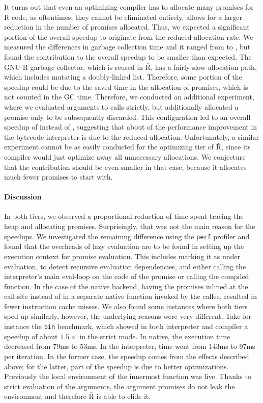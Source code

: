 \documentclass[screen,acmsmall]{acmart}
\renewcommand{\Rsh}{{\sf\v R}\xspace}
\begin{document}
It turns out that even an optimizing compiler has to allocate many promises for
R code, as oftentimes, they cannot be eliminated entirely. \rshstrict allows for
a larger reduction in the number of promises allocated. Thus, we expected a
significant portion of the overall speedup to originate from the reduced
allocation rate. We measured the differences in garbage collection time and it
ranged from \speedupGCRshStrictMin to \speedupGCRshStrictMax, but found the
contribution to the overall speedup to be smaller than expected. The GNU R
garbage collector, which is reused in \Rsh, has a fairly slow allocation path,
which includes mutating a doubly-linked list. Therefore, some portion of the
speedup could be due to the saved time in the allocation of promises, which is
not counted in the GC time. Therefore, we conducted an additional experiment,
where we evaluated arguments to calls strictly, but additionally allocated a
promise only to be subsequently discarded. This configuration led to an overall
speedup of \speedupBCRshStrictAlloc instead of \speedupBCRshStrict, suggesting
that about \speedupDueToReducedGC of the performance improvement in the bytecode
interpreter is due to the reduced allocation. Unfortunately, a similar
experiment cannot be as easily conducted for the optimizing tier of \Rsh, since
its compiler would just optimize away all unnecessary allocations. We conjecture
that the contribution should be even smaller in that case, because it allocates
much fewer promises to start with.

\paragraph{Discussion}

In both tiers, we observed a proportional reduction of time spent tracing the
heap and allocating promises. Surprisingly, that was not the main reason
for the speedups. We investigated the remaining difference using the
\lstinline{perf} profiler and found that the overheads of lazy evaluation are to
be found in setting up the execution context for promise evaluation. This
includes marking it as under evaluation, to detect recursive evaluation dependencies,
and either calling the interpreter's main eval-loop on the code of the promise or
calling the compiled function. In the case of the native backend, having the
promises inlined at the call-site instead of in a separate native function
invoked by the callee, resulted in fewer instruction cache misses. We also found
some instances where both tiers sped up similarly, however, the underlying
reasons were very different. Take for instance the \lstinline{bin} benchmark,
which showed in both interpreter and compiler a speedup of about $1.5\times$ in
the strict mode. In native, the execution time decreased from 79ms to 53ms. In
the interpreter, time went from 143ms to 97ms per iteration. In the former case,
the speedup comes from the effects described above; for the latter, part of the
speedup is due to better optimizations. Previously the local environment of
the innermost function was live. Thanks to strict evaluation of the arguments,
the argument promises do not leak the environment and therefore \Rsh is able to
elide it.
\end{document}

